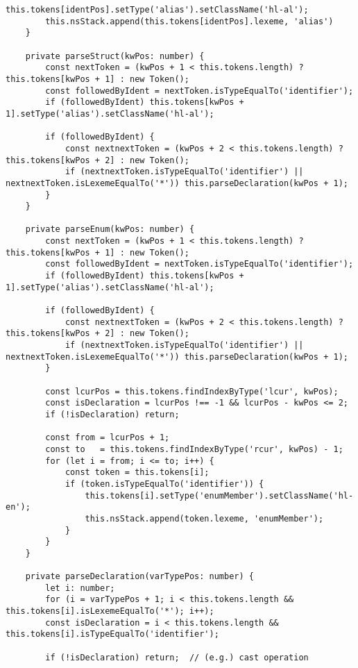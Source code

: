 \documentclass[autodetect-engine,dvi=dvipdfmx,ja=standard,
               a4j,11pt]{bxjsarticle}
\begin{document}
\begin{lstlisting}[caption={Cハイライタ({\tt c.ts})}, label={prog:c}]
        this.tokens[identPos].setType('alias').setClassName('hl-al');
        this.nsStack.append(this.tokens[identPos].lexeme, 'alias')
    }

    private parseStruct(kwPos: number) {
        const nextToken = (kwPos + 1 < this.tokens.length) ? this.tokens[kwPos + 1] : new Token();
        const followedByIdent = nextToken.isTypeEqualTo('identifier');
        if (followedByIdent) this.tokens[kwPos + 1].setType('alias').setClassName('hl-al');

        if (followedByIdent) {
            const nextnextToken = (kwPos + 2 < this.tokens.length) ? this.tokens[kwPos + 2] : new Token();
            if (nextnextToken.isTypeEqualTo('identifier') || nextnextToken.isLexemeEqualTo('*')) this.parseDeclaration(kwPos + 1);
        }
    }

    private parseEnum(kwPos: number) {
        const nextToken = (kwPos + 1 < this.tokens.length) ? this.tokens[kwPos + 1] : new Token();
        const followedByIdent = nextToken.isTypeEqualTo('identifier');
        if (followedByIdent) this.tokens[kwPos + 1].setType('alias').setClassName('hl-al');

        if (followedByIdent) {
            const nextnextToken = (kwPos + 2 < this.tokens.length) ? this.tokens[kwPos + 2] : new Token();
            if (nextnextToken.isTypeEqualTo('identifier') || nextnextToken.isLexemeEqualTo('*')) this.parseDeclaration(kwPos + 1);
        }

        const lcurPos = this.tokens.findIndexByType('lcur', kwPos);
        const isDeclaration = lcurPos !== -1 && lcurPos - kwPos <= 2;
        if (!isDeclaration) return;

        const from = lcurPos + 1;
        const to   = this.tokens.findIndexByType('rcur', kwPos) - 1;
        for (let i = from; i <= to; i++) {
            const token = this.tokens[i];
            if (token.isTypeEqualTo('identifier')) {
                this.tokens[i].setType('enumMember').setClassName('hl-en');
                this.nsStack.append(token.lexeme, 'enumMember');
            }
        }
    }

    private parseDeclaration(varTypePos: number) {
        let i: number;
        for (i = varTypePos + 1; i < this.tokens.length && this.tokens[i].isLexemeEqualTo('*'); i++);
        const isDeclaration = i < this.tokens.length && this.tokens[i].isTypeEqualTo('identifier');

        if (!isDeclaration) return;  // (e.g.) cast operation


\end{lstlisting}
\end{document}
